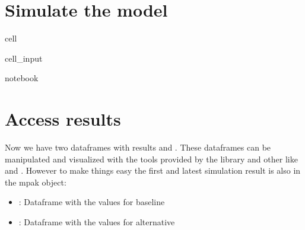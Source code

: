\documentclass[letterpaper,10pt,english]{jupyterBook}
\begin{document}
\section{Simulate the model}
\label{\detokenize{content/howto/experiments/Standard experiment simple:simulate-the-model}}
\begin{sphinxuseclass}{cell}\begin{sphinxVerbatimInput}

\begin{sphinxuseclass}{cell_input}
\begin{sphinxVerbatim}[commandchars=\\\{\}]
 notebook 
   
\end{sphinxVerbatim}

\end{sphinxuseclass}\end{sphinxVerbatimInput}

\end{sphinxuseclass}

\section{Access results}
\label{\detokenize{content/howto/experiments/Standard experiment simple:access-results}}
\sphinxAtStartPar
Now we have two dataframes with results  and . These dataframes can be manipulated and visualized
with the tools provided by the  library and other like  and . However to make things easy the first and
latest simulation result is also in the mpak object:
\begin{itemize}
\item {} 
\sphinxAtStartPar
{}: Dataframe with the values for baseline

\item {} 
\sphinxAtStartPar
{}: Dataframe with the values for alternative

\end{itemize}
\end{document}
